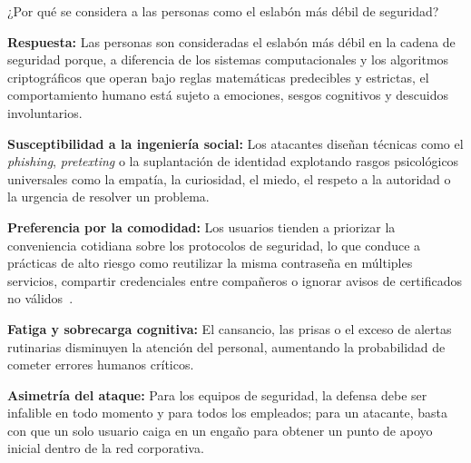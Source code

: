 ¿Por qué se considera a las personas como el eslabón más débil de seguridad?

\textbf{Respuesta:}
Las personas son consideradas el eslabón más débil en la cadena de seguridad porque, a diferencia de los sistemas computacionales y los algoritmos criptográficos que operan bajo reglas matemáticas predecibles y estrictas, el comportamiento humano está sujeto a emociones, sesgos cognitivos y descuidos involuntarios.

\begin{itemizeColor}
    \item \textbf{Susceptibilidad a la ingeniería social:} Los atacantes diseñan técnicas como el \textit{phishing}, \textit{pretexting} o la suplantación de identidad explotando rasgos psicológicos universales como la empatía, la curiosidad, el miedo, el respeto a la autoridad o la urgencia de resolver un problema.
    \item \textbf{Preferencia por la comodidad:} Los usuarios tienden a priorizar la conveniencia cotidiana sobre los protocolos de seguridad, lo que conduce a prácticas de alto riesgo como reutilizar la misma contraseña en múltiples servicios, compartir credenciales entre compañeros o ignorar avisos de certificados no válidos~\cite{nist_sp800_63b}.
    \item \textbf{Fatiga y sobrecarga cognitiva:} El cansancio, las prisas o el exceso de alertas rutinarias disminuyen la atención del personal, aumentando la probabilidad de cometer errores humanos críticos.
    \item \textbf{Asimetría del ataque:} Para los equipos de seguridad, la defensa debe ser infalible en todo momento y para todos los empleados; para un atacante, basta con que un solo usuario caiga en un engaño para obtener un punto de apoyo inicial dentro de la red corporativa.
\end{itemizeColor}

